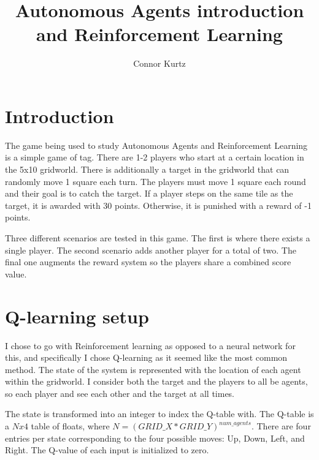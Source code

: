\documentclass[sigconf]{aamas}
\title[Multiagent Systems: Homework 2]{Autonomous Agents introduction and Reinforcement Learning}
\author{Connor Kurtz}
\affiliation{
  \institution{Oregon State University}
  \city{Corvallis, OR}}
\begin{document}

\pagestyle{fancy}
\fancyhead{}


\maketitle 


\section{Introduction}
The game being used to study Autonomous Agents and Reinforcement Learning
is a simple game of tag. There are 1-2 players who start at a certain
location in the 5x10 gridworld. There is additionally a target in the 
gridworld that can randomly move 1 square each turn. The players must 
move 1 square each round and their goal is to catch the target. If a
player steps on the same tile as the target, it is awarded with 30 points.
Otherwise, it is punished with a reward of -1 points. 

Three different scenarios are tested in this game. The first is where there 
exists a single player. The second scenario adds another player for a
total of two. The final one augments the reward system so the players share
a combined score value.



\section{Q-learning setup}

I chose to go with Reinforcement learning as opposed to a neural 
network for this, and specifically I chose Q-learning as it seemed 
like the most common method. The state of the system is represented 
with the location of each agent within the gridworld. I consider both
the target and the players to all be agents, so each player and see 
each other and the target at all times.

The state is transformed into an integer to index the Q-table with. The 
Q-table is a $Nx4$ table of floats, where $N=(GRID\_X * GRID\_Y)^
{num\_agents}$. There are four entries per state corresponding to the 
four possible moves: Up, Down, Left, and Right. The Q-value of each input 
is initialized to zero. 
\end{document}
